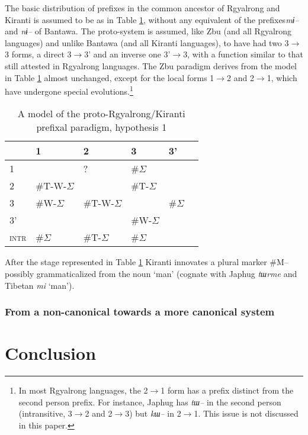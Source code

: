 \documentclass[twoside,a4paper,11pt]{article}
\newcommand{\ipa}[1]{{\phon\textit{#1}}}
\newcommand{\grise}[1]{\cellcolor{lightgray}\textbf{#1}}
\newcommand{\Σ}{\greek{Σ}}
\newcommand{\ro}{$\Sigma$}
\begin{document}
The basic distribution of prefixes in the common ancestor of Rgyalrong and Kiranti is assumed to be as in Table \ref{tab:proto.st1}, without any equivalent of the prefixes\ipa{mɨ--} and \ipa{nɨ--} of Bantawa. The proto-system is assumed, like Zbu (and all Rgyalrong languages) and unlike Bantawa (and all Kiranti languages), to have had two 3$\rightarrow$3 forms, a direct 3$\rightarrow$3' and an inverse one 3'$\rightarrow$3, with a function similar to that still attested in   Rgyalrong languages. The Zbu paradigm derives from the model in Table \ref{tab:proto.st1} almost unchanged, except for the local forms 1$\rightarrow$2 and 2$\rightarrow$1, which have undergone special evolutions.\footnote{In most Rgyalrong languages, the 2$\rightarrow$1 form has a  prefix distinct from the second person prefix. For instance, Japhug has   \ipa{tɯ--} in the second person (intransitive, 3$\rightarrow$2 and 2$\rightarrow$3) but \ipa{kɯ--} in 2$\rightarrow$1. This issue is not discussed in this paper.}


\begin{table}[H] 
\caption{A model of the proto-Rgyalrong/Kiranti prefixal paradigm, hypothesis 1} 
 \centering \label{tab:proto.st1}
\begin{tabular}{l|lllll} 
\toprule
&1 & 2 &3 & 3'\\
\hline
1 &\grise{} & ? &  \#\ro{} \\
2&\#T-W-\ro{} & \grise{} &\#T-\ro{}\\
3&\#W-\ro{} &\#T-W-\ro{} & \grise{} &\#\ro{} \\
3'&&&\#W-\ro{} \\
\hline
\textsc{intr}&\#\ro{}&\#T-\ro{}&\#\ro{}\\
\bottomrule
\end{tabular}
\end{table}
After the stage represented in Table \ref{tab:proto.st1} Kiranti innovates a plural marker \#M-- possibly grammaticalized from the noun `man' (cognate with Japhug \ipa{tɯrme} and Tibetan \ipa{mi} `man').

\subsubsection{From a non-canonical towards a more canonical system}



\section{Conclusion}


 
 
\end{document}
